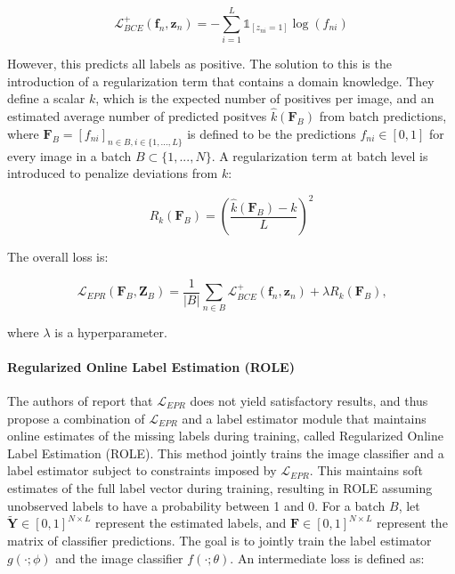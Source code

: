 \documentclass[lettersize,journal]{IEEEtran}
\begin{document}
\begin{equation}
    \mathcal{L}_{BCE}^+(\mathbf{f}_n,\mathbf{z}_n) = - \sum_{i=1}^{L}\mathds{1}_{[z_{ni}=1]}\log(f_{ni})
\end{equation}

However, this predicts all labels as positive. The solution to this is the introduction of a regularization term that contains a domain knowledge. They define a scalar $k$, which is the expected number of positives per image, and an estimated average number of predicted positves $\hat{k}(\mathbf{F}_B)$ from batch predictions, where $\mathbf{F}_B = [f_{ni}]_{n\in B,i\in\{1,...,L\}}$ is defined to be the predictions $f_{ni}\in[0,1]$ for every image in a batch $B\subset \{1,...,N\}$. A regularization term at batch level is introduced to penalize deviations from $k$:

\begin{equation}
    R_k(\mathbf{F}_B) = \left(\frac{\hat{k}(\mathbf{F}_B)-k}{L}\right)^2
\end{equation}

\noindent The overall loss is:

\begin{equation}
    \label{eq:epr}
    \mathcal{L}_{EPR}(\mathbf{F}_B,\mathbf{Z}_B) = \frac{1}{|B|}\sum_{n\in B}\mathcal{L}_{BCE}^+(\mathbf{f}_n,\mathbf{z}_n)+\lambda R_k(\mathbf{F}_B)\text{,}
\end{equation}

where $\lambda$ is a hyperparameter.


\paragraph{Regularized Online Label Estimation (ROLE)}
The authors of \cite{mlsp} report that $\mathcal{L}_{EPR}$ does not yield satisfactory results, and thus propose a combination of $\mathcal{L}_{EPR}$ and a label estimator module that maintains online estimates of the missing labels during training, called Regularized Online Label Estimation (ROLE). This method jointly trains the image classifier and a label estimator subject to constraints imposed by $\mathcal{L}_{EPR}$. This maintains soft estimates of the full label vector during training, resulting in ROLE assuming unobserved labels to have a probability between 1 and 0. For a batch $B$, let $\mathbf{\tilde{Y}}\in[0,1]^{N\times L}$ represent the estimated labels, and $\mathbf{F}\in[0,1]^{N\times L}$ represent the matrix of classifier predictions. The goal is to jointly train the label estimator $g(\cdot;\phi)$ and the image classifier $f(\cdot;\theta)$. An intermediate loss is defined as:
\end{document}
